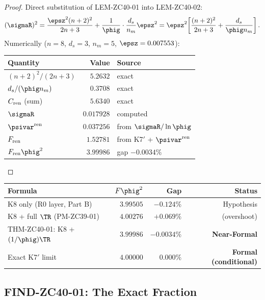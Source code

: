 \documentclass[12pt, a4paper]{article}
\begin{document}
\begin{proof}
Direct substitution of LEM-ZC40-01 into LEM-ZC40-02:
\[
  (\sigmaR)^2
  = \frac{\epsz^2(n+2)^2}{2n+3} + \frac{1}{\phig}\cdot\frac{d_s}{n_m}\epsz^2
  = \epsz^2\!\left[\frac{(n+2)^2}{2n+3} + \frac{d_s}{\phig n_m}\right].
\]
Numerically ($n=8$, $d_s=3$, $n_m=5$, $\epsz=0.007553$):
\begin{center}
\renewcommand{\arraystretch}{1.3}
\begin{tabular}{lrl}
\toprule
Quantity & Value & Source \\
\midrule
$(n+2)^2/(2n+3)$ & $5.2632$ & exact \\
$d_s/(\phig n_m)$ & $0.3708$ & exact \\
$C_{\rm ren}$ (sum) & $5.6340$ & exact \\
$\sigmaR$ & $0.017928$ & computed \\
$\psivar^{\rm ren}$ & $0.037256$ & from $\sigmaR/\ln\phig$ \\
$F_{\rm ren}$ & $1.52781$ & from K7$'$ + $\psivar^{\rm ren}$ \\
$F_{\rm ren}\phig^2$ & $3.99986$ & gap $-0.0034\%$ \\
\bottomrule
\end{tabular}
\end{center}
\end{proof}

\begin{keybox}[title={Gap Reduction History for K14}]
\begin{center}
\renewcommand{\arraystretch}{1.3}
\begin{tabular}{lrrr}
\toprule
Formula & $F\phig^2$ & Gap & Status \\
\midrule
K8 only (R0 layer, Part B) & $3.99505$ & $-0.124\%$ & Hypothesis \\
K8 + full $\TR$ (PM-ZC39-01) & $4.00276$ & $+0.069\%$ & (overshoot) \\
THM-ZC40-01: K8 + $(1/\phig)\TR$ & $3.99986$ & $-0.0034\%$ & \textbf{Near-Formal} \\
Exact K7$'$ limit & $4.00000$ & $0.000\%$ & \textbf{Formal (conditional)} \\
\bottomrule
\end{tabular}
\end{center}
\end{keybox}

\subsection{FIND-ZC40-01: The Exact Fraction}
\label{sec:exact}
\end{document}
